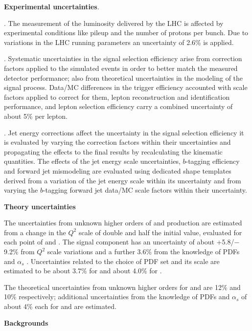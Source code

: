 \textbf{Experimental uncertainties}.

\bit
\item {}. The measurement of the luminosity delivered by the LHC is affected by experimental conditions like pileup and the number of protons per bunch. Due to variations in the LHC running parameters an uncertainty of 2.6\% is applied.

\item {}. Systematic uncertainties in the signal selection efficiency arise from correction factors applied to the simulated events in order to better match the measured detector performance; also from theoretical uncertainties in the modeling of the signal process. Data/MC differences in the trigger efficiency accounted with scale factors applied to correct for them, lepton reconstruction and identification performance, and lepton selection efficiency carry a combined uncertainty of about 5\% per lepton.

\item {}. Jet energy corrections affect the uncertainty in the signal selection efficiency it is evaluated by varying the correction factors within their uncertainties and propagating the effects to the final results by recalculating the kinematic quantities. The effects of the jet energy scale uncertainties, $b$-tagging efficiency and forward jet mismodeling are evaluated using dedicated shape templates derived from a variation of the jet energy scale within its uncertainty and from varying the $b$-tagging forward jet data/MC scale factors within their uncertainty.
\eit

\textbf{Theory uncertainties}

The uncertainties from unknown higher orders of \tHq and \tHW production are estimated from a change in the $Q^2$ scale of double and half the initial value, evaluated for each point of \Ct and \CV. The \ttH signal component has an uncertainty of about +5.8/− 9.2\% from $Q^2$ scale variations and a further 3.6\% from the knowledge of PDFs and $\alpha_s $ \cite{yellow}. Uncertainties related to the choice of PDF set and its scale are estimated to be about 3.7\% for \tHq and about 4.0\% for \tHW.

The theoretical uncertainties from unknown higher orders for \ttW and \ttZ are 12\% and 10\% respectively; additional uncertainties from the knowledge of PDFs and $\alpha_s $ of about 4\% each for \ttW and \ttZ are estimated.

\textbf{Backgrounds}

